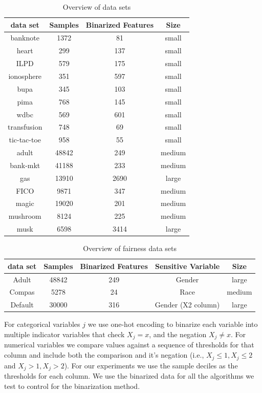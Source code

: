 \documentclass[twoside,11pt]{article}
\begin{document}
\begin{table}[h]
\centering
\caption{\label{tab:data sets} Overview of data sets}
\setlength{\tabcolsep}{5pt} %
\begin{tabular}{c c c c}		\toprule
data set & Samples & Binarized Features & Size \\ \midrule 
banknote & 1372 & 81 & small \\
heart & 299 & 137 & small \\
ILPD & 579 & 175 & small \\
ionosphere & 351 & 597 & small \\
bupa & 345 & 103 & small \\
pima & 768 & 145 & small \\
wdbc & 569 & 601 & small \\
transfusion & 748 & 69 & small \\
tic-tac-toe & 958 & 55 & small \\ \midrule
adult & 48842 & 249 & medium \\
bank-mkt & 41188 & 233 & medium \\
gas & 13910 & 2690 & large \\
FICO & 9871 & 347 & medium \\ 
magic & 19020 & 201 & medium \\
mushroom & 8124 & 225 & medium \\
musk & 6598 & 3414 & large \\
\bottomrule
\end{tabular}%
\end{table}%

\begin{table}[h]
\centering
\caption{\label{tab:fairdata sets} Overview of fairness data sets}
\setlength{\tabcolsep}{5pt} %
\begin{tabular}{c c c c c}		\toprule
data set & Samples & Binarized Features & Sensitive Variable & Size \\ \midrule 
Adult & 48842 & 249 & Gender & large\\
Compas & 5278 & 24 & Race & medium \\
Default & 30000 & 316 & Gender (X2 column) & large\\ 
\bottomrule
\end{tabular}%
\end{table}%


For categorical variables $j$ we use one-hot encoding to binarize each variable into multiple indicator variables that check $X_{j} = x$, and the negation $X_{j} \neq x$. For numerical variables we compare values against a sequence of thresholds for that column and include both the comparison and it's negation (i.e., $X_j \leq 1, X_j \leq 2$ and $X_j > 1, X_j > 2$). For our experiments we use the sample deciles as the thresholds for each column. We use the binarized data for all the algorithms we test to control for the binarization method.
\end{document}
